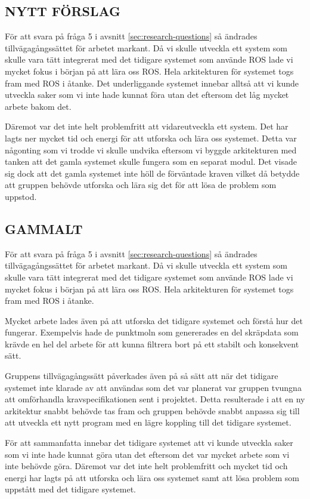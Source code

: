 \subsection{NYTT FÖRSLAG}
För att svara på fråga 5 i avsnitt \ref{sec:research-questions} så ändrades tillvägagångssättet för arbetet markant. Då vi skulle utveckla ett system som skulle vara tätt integrerat med det tidigare systemet som använde ROS lade vi mycket fokus i början på att lära oss ROS. Hela arkitekturen för systemet togs fram med ROS i åtanke. Det underliggande systemet innebar alltså att vi kunde utveckla saker som vi inte hade kunnat föra utan det eftersom det låg mycket arbete bakom det.

Däremot var det inte helt problemfritt att vidareutveckla ett system. Det har lagts ner mycket tid och energi för att utforska och lära oss systemet. Detta var någonting som vi trodde vi skulle undvika eftersom vi byggde arkitekturen med tanken att det gamla systemet skulle fungera som en separat modul. Det visade sig dock att det gamla systemet inte höll de förväntade kraven vilket då betydde att gruppen behövde utforska och lära sig det för att lösa de problem som uppstod. 

\subsection{GAMMALT}
För att svara på fråga 5 i avsnitt \ref{sec:research-questions} så ändrades tillvägagångssättet för arbetet markant. Då vi skulle utveckla ett system som skulle vara tätt integrerat med det tidigare systemet som använde ROS lade vi mycket fokus i början på att lära oss ROS. Hela arkitekturen för  systemet togs fram med ROS i åtanke.

Mycket arbete lades även på att utforska det tidigare systemet och förstå hur det fungerar. Exempelvis hade de punktmoln som genererades en del skräpdata som krävde en hel del arbete för att kunna filtrera bort på ett stabilt och konsekvent sätt.

Gruppens tillvägagångssätt påverkades även på så sätt att när det tidigare systemet inte klarade av att användas som det var planerat var gruppen tvungna att omförhandla kravspecifikationen sent i projektet. Detta resulterade i att en ny arkitektur snabbt behövde tas fram och gruppen behövde snabbt anpassa sig till att utveckla ett nytt program med en lägre koppling till det tidigare systemet.

För att sammanfatta innebar det tidigare systemet att vi kunde utveckla saker som vi inte hade kunnat göra utan det eftersom det var mycket arbete som vi inte behövde göra. Däremot var det inte helt problemfritt och mycket tid och energi har lagts på att utforska och lära oss systemet samt att lösa problem som uppstått med det tidigare systemet.

